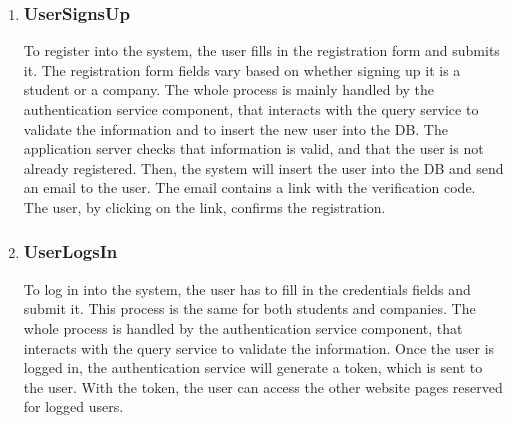 \begin{enumerate}[label=\textbf{RV\arabic* -}]

\item \subsubsection{UserSignsUp}

To register into the system, the user fills in the registration form and submits it.
The registration form fields vary based on whether signing up it is a student or a company.
The whole process is mainly handled by the authentication service component, that interacts with the query service to validate the information and to insert the new user into the DB.
The application server checks that information is valid, and that the user is not already registered.
Then, the system will insert the user into the DB and send an email to the user.
The email contains a link with the verification code.
The user, by clicking on the link, confirms the registration.

\begin{figure}[H]
    \centering
\end{figure}

\item \subsubsection{UserLogsIn}

To log in into the system, the user has to fill in the credentials fields and submit it.
This process is the same for both students and companies.
The whole process is handled by the authentication service component, that interacts with the query service to validate the information.
Once the user is logged in, the authentication service will generate a token, which is sent to the user.
With the token, the user can access the other website pages reserved for logged users.


\end{enumerate}
